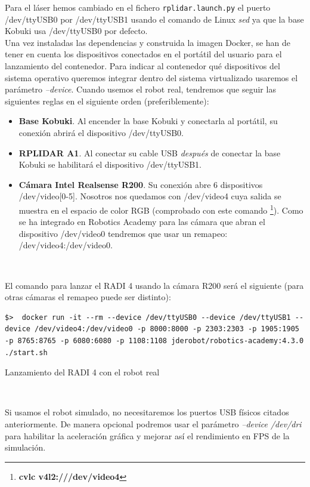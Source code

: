 Para el láser hemos cambiado en el fichero \texttt{rplidar.launch.py} el puerto /dev/ttyUSB0 por /dev/ttyUSB1 usando el comando de Linux \textit{sed} ya que la base Kobuki usa /dev/ttyUSB0 por defecto.\\

Una vez instaladas las dependencias y construida la imagen Docker, se han de tener en cuenta los dispositivos conectados en el portátil del usuario para el lanzamiento del contenedor. Para indicar al contenedor qué dispositivos del sistema operativo queremos integrar dentro del sistema virtualizado usaremos el parámetro \textit{--device}. Cuando usemos el robot real, tendremos que seguir las siguientes reglas en el siguiente orden (preferiblemente):\\

\begin{itemize}
	\item \textbf{Base Kobuki}. Al encender la base Kobuki y conectarla al portátil, su conexión abrirá el dispositivo /dev/ttyUSB0.
	\item \textbf{RPLIDAR A1}. Al conectar su cable USB \textit{después} de conectar la base Kobuki se habilitará el dispositivo /dev/ttyUSB1.
	\item \textbf{Cámara Intel Realsense R200}. Su conexión abre 6 dispositivos /dev/video[0-5]. Nosotros nos quedamos con /dev/video4 cuya salida se muestra en el espacio de color RGB (comprobado con este comando \footnote{\textbf{cvlc v4l2:///dev/video4}}). Como se ha integrado en Robotics Academy para las cámara que abran el dispositivo /dev/video0 tendremos que usar un remapeo: /dev/video4:/dev/video0.
\end{itemize}\

El comando para lanzar el RADI 4 usando la cámara R200 será el siguiente (para otras cámaras el remapeo puede ser distinto):\\

\begin{code}[H]
\begin{lstlisting}
$>  docker run -it --rm --device /dev/ttyUSB0 --device /dev/ttyUSB1 --device /dev/video4:/dev/video0 -p 8000:8000 -p 2303:2303 -p 1905:1905 -p 8765:8765 -p 6080:6080 -p 1108:1108 jderobot/robotics-academy:4.3.0 ./start.sh
\end{lstlisting}
\caption{Lanzamiento del RADI 4 con el robot real}
\label{cod:lanzamiento_radi_robot_real}
\end{code}\

Si usamos el robot simulado, no necesitaremos los puertos USB físicos citados anteriormente. De manera opcional podremos usar el parámetro \textit{--device /dev/dri} para habilitar la aceleración gráfica y mejorar así el rendimiento en FPS de la simulación.\\

